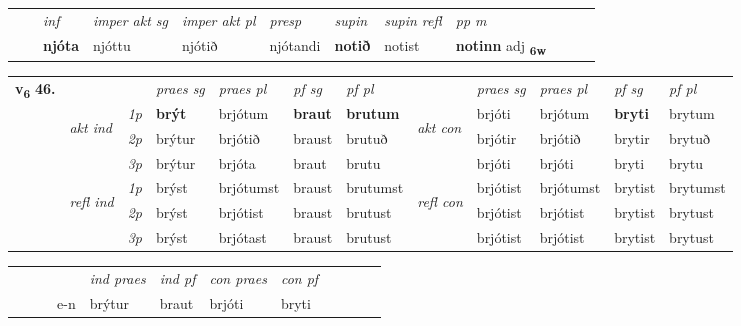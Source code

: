 \begin{tabular}{llllllllllll}
 & & \textit{inf} & \textit{imper akt sg} & \textit{imper akt pl}   & \textit{presp} & \textit{supin} & \textit{supin refl} & \textit{pp m}     \\*
  & & \textbf{njóta} & njóttu  & njótið   & njótandi &  \textbf{notið} & notist & \textbf{notinn} adj \textbf{\textsubscript{6w}} \\*
\cmidrule{1-12}
\end{tabular}



\begin{tabular}{llllllllllll} \toprule
\multirow{4}{*}{{{\textbf{v{\textsubscript{6}}} \Large{\textbf{46.}}}}}  & &   &  \textit{praes sg}  & \textit{praes pl}  &\textit{ pf sg} & \textit{pf pl} &  &  \textit{praes sg}  & \textit{praes pl}  & \textit{pf sg} & \textit{pf pl } \\*
	\cmidrule{4-7} \cmidrule{9-12}
 & \multirow{3}{*}{\begin{turn}{90}\textit{akt ind}\end{turn}} & {\textit{1p}} & \textbf{brýt} & brjótum    & \textbf{braut} & \textbf{brutum} & \multirow{3}{*}{\begin{turn}{90}\textit{akt con}\end{turn}} &brjóti & brjótum & \textbf{bryti} & brytum\\*
& &  {\textit{2p}} &  brýtur  & brjótið   & braust & brutuð & & brjótir & brjótið & brytir & brytuð \\*
& &  {\textit{3p}} & brýtur & brjóta   & braut & brutu & & brjóti & brjóti& bryti & brytu  \\*
\cmidrule{4-7} \cmidrule{9-12}
 &\multirow{3}{*}{\begin{turn}{90}\textit{refl ind}\end{turn}} & {\textit{1p}} & brýst & brjótumst    & braust & brutumst & \multirow{3}{*}{\begin{turn}{90}\textit{refl con}\end{turn}}  &brjótist & brjótumst & brytist & brytumst\\*
 &&  {\textit{2p}} &  brýst  & brjótist   & braust & brutust & &brjótist & brjótist & brytist & brytust \\*
& &  {\textit{3p}} & brýst & brjótast   & braust & brutust & & brjótist & brjótist& brytist & brytust  \\*
\cmidrule{4-7} \cmidrule{9-12}
\end{tabular}


\begin{tabular}{llllllllllll}
 & &  & &  \textit{ind praes} & \textit{ind pf} & \textit{con praes} & \textit{con pf} \\*
&  & & e-n & brýtur & braut & brjóti & bryti \\*
\cmidrule{5-9}
\end{tabular}


